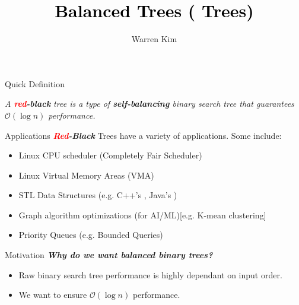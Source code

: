 \documentclass[aspectratio=169]{beamer}
\title{\textcolor{black}{Balanced Trees (\textib{\textcolor{red}{Red}}\textib{-Black} Trees)}}
\author{Warren Kim}
\date{}
\newcommand{\textib}[1]{\textit{\textbf{{#1}}}}
\newcommand{\red}{\textib{\textcolor{red}{red}}}
\newenvironment{define}{\begin{tcolorbox}[title={Definition}]\begin{small}}{\end{small}\end{tcolorbox}}
\begin{document}
\maketitle

\begin{frame}[fragile]{Quick Definition}
    \begin{define}
        \it
        {
            A \red\textib{-black} tree is a type of \textib{self-balancing} binary search tree that
            guarantees $\mathcal{O}(\log n)$ performance.
        }
    \end{define}
    \exampleone
\end{frame}


\begin{frame}{Applications}
    \textib{\textcolor{red}{Red}-Black} Trees have a variety of applications. Some include:
    \begin{itemize}[label=$\to$]
        \item Linux CPU scheduler (Completely Fair Scheduler)
        \item Linux Virtual Memory Areas (VMA)
        \item STL Data Structures (e.g. C++'s , Java's )
        \item Graph algorithm optimizations (for AI/ML)[e.g. K-mean clustering]
        \item Priority Queues (e.g. Bounded Queries)
    \end{itemize}
\end{frame}


\begin{frame}{Motivation}
    \textib{Why do we want balanced binary trees?}
    \begin{itemize}[label=$\to$]
        \item Raw binary search tree performance is highly dependant on input order.
        \item We want to ensure $\mathcal{O}(\log n)$ performance.
    \end{itemize}
\end{frame}
\end{document}
